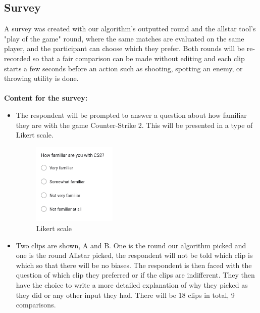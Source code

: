 \subsection{Survey}
\label{sec:survey}
A survey was created with our algorithm's outputted round and the \Gls{allstar} tool's "play of the game" round, where the same matches are evaluated on the same player, and the participant can choose which they prefer. Both rounds will be re-recorded so that a fair comparison can be made without editing and each clip starts a few seconds before an action such as shooting, spotting an enemy, or throwing utility is done.\\\\
\textbf{}
\textbf {Content for the survey:}
\begin{itemize}
    \item The respondent will be prompted to answer a question about how familiar they are with the game Counter-Strike 2. This will be presented in a type of Likert scale. 
    \begin{figure}[H]
        \centering
        \includegraphics[width=4cm]{Images/likertscale.png}
        \caption{Likert scale}
        \label{fig:likerScale}
    \end{figure}
    \item Two clips are shown, A and B. One is the round our algorithm picked and one is the round Allstar picked, the respondent will not be told which clip is which so that there will be no biases. The respondent is then faced with the question of which clip they preferred or if the clips are indifferent. They then have the choice to write a more detailed explanation of why they picked as they did or any other input they had. There will be 18 clips in total, 9 comparisons.
    \begin{figure}[H]
        \centering

\end{figure}
\end{itemize}
